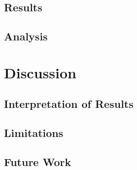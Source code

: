 \documentclass[11pt,a4paper]{article}
\begin{document}
\subsection{Results}
\label{subsec:results}


\subsection{Analysis}
\label{subsec:analysis}


\section{Discussion}
\label{sec:discussion}


\subsection{Interpretation of Results}
\label{subsec:interpretation}


\subsection{Limitations}
\label{subsec:limitations}


\subsection{Future Work}
\label{subsec:future_work}
\end{document}
